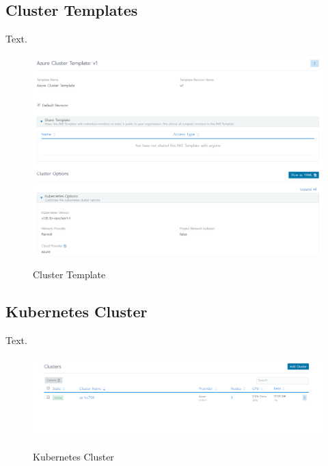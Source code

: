 \subsection{Cluster Templates}

Text. 

\begin{figure}[H]
\centering
\caption {Cluster Template}
\includegraphics[width=\linewidth]{images/cluster-template.png}
\label{fig:clusterTemplate}
\end{figure}

\subsection{Kubernetes Cluster}

Text. 

\begin{figure}[H]
\centering
\caption {Kubernetes Cluster}
\includegraphics[width=\linewidth]{images/cluster-overview.png}
\label{fig:clusterOverview}
\end{figure}

